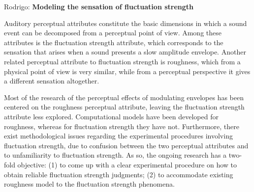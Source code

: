 \documentclass{report}
\begin{document}
Rodrigo: \textbf{Modeling the sensation of fluctuation strength}

Auditory perceptual attributes constitute the basic dimensions in which a sound
event can be decomposed from a perceptual point of view. Among these attributes
is the fluctuation strength attribute, which corresponds to the sensation that
arises when a sound presents a slow amplitude envelope. Another related
perceptual attribute to fluctuation strength is roughness, which from a physical
point of view is very similar, while from a perceptual perspective it gives a
different sensation altogether.

Most of the research of the perceptual effects of modulating envelopes has been
centered on the roughness perceptual attribute, leaving the fluctuation strength
attribute less explored. Computational models have been developed for roughness,
whereas for fluctuation strength they have not. Furthermore, there exist
methodological issues regarding the experimental procedures involving
fluctuation strength, due to confusion between the two perceptual attributes and
to unfamiliarity to fluctuation strength. As so, the ongoing research has a
two-fold objective: (1) to come up with a clear experimental procedure on how
to obtain reliable fluctuation strength judgments; (2) to accommodate existing
roughness model to the fluctuation strength phenomena.
\end{document}
